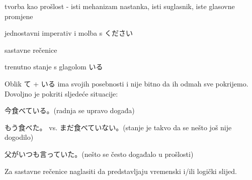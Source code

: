
\author{Tomislav Mamić}

	
	\begin{hyou}
		\item tvorba kao prošlost - isti mehanizam nastanka, isti suglasnik, iste glasovne promjene
		\item jednostavni imperativ i molba s ください
		\item sastavne rečenice
		\item trenutno stanje s glagolom いる
	\end{hyou}

	\begin{hyou}
		\item Oblik て + いる ima svojih posebnosti i nije bitno da ih odmah sve pokrijemo. Dovoljno je pokriti sljedeće situacije:
		\begin{hyou}
			\item 今食べている。(radnja se upravo događa)
			\item もう食べた。 vs. まだ食べていない。(stanje je takvo da se nešto još nije dogodilo)
			\item 父がいつも言っていた。(nešto se često događalo u prošlosti)
		\end{hyou}
		\item Za sastavne rečenice naglasiti da predstavljaju vremenski i/ili logički slijed.
	\end{hyou}
